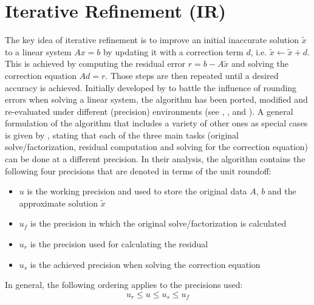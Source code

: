 \chapter{Iterative Refinement (IR)}
\label{chap:iterative_refinement}

The key idea of iterative refinement is to improve an initial inaccurate solution $\tilde{x}$ to a linear system $Ax=b$ by updating it with a correction term $d$, i.e. $\tilde{x}\leftarrow \tilde{x} + d$. This is achieved by computing the residual error $r=b-A\tilde{x}$ and solving the correction equation $Ad=r$. Those steps are then repeated until a desired accuracy is achieved. Initially developed by \cite{wilkinson_rounding_1963} to battle the influence of rounding errors when solving a linear system, the algorithm has been ported, modified and  re-evaluated under different (precision) environments (see \cite{moler_iterative_1967}, \cite{skeel_iterative_1980}, \cite{buttari_mixed_2007} and \cite{carson_accelerating_2018}). A general formulation of the algorithm that includes a variety of other ones as special cases is given by \cite{carson_accelerating_2018}, stating that each of the three main tasks (original solve/factorization, residual computation and solving for the correction equation) can be done at a different precision. In  their analysis, the algorithm contains the following four precisions that are denoted in terms of the unit roundoff:
\begin{itemize}
    \item $u$ is the working precision and used to store the original data $A$, $b$ and the approximate solution $\tilde{x}$
    \item $u_f$ is the precision in which the original solve/factorization is calculated
    \item $u_r$ is the precision used for calculating the residual
    \item $u_s$ is the achieved precision when solving the correction equation
\end{itemize}
In general, the following ordering applies to the precisions used:
\begin{equation}
    u_r \leq u \leq u_s \leq u_f
\end{equation}

